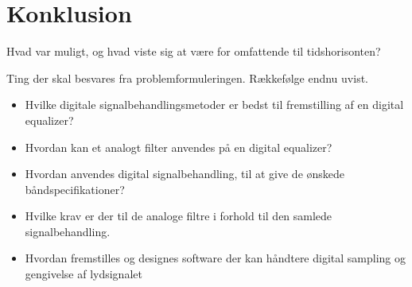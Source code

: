 \chapter{Konklusion} \label{kap:konklusion}

Hvad var muligt, og hvad viste sig at være for omfattende til tidshorisonten?

Ting der skal besvares fra problemformuleringen. Rækkefølge endnu uvist.
\begin{itemize}[noitemsep]
	\item Hvilke digitale signalbehandlingsmetoder er bedst til fremstilling af en digital equalizer?
	\item Hvordan kan et analogt filter anvendes på en digital equalizer?
	\item Hvordan anvendes digital signalbehandling, til at give de ønskede båndspecifikationer?
	\item Hvilke krav er der til de analoge filtre i forhold til den samlede signalbehandling.
	\item Hvordan fremstilles og designes software der kan håndtere digital sampling og gengivelse af lydsignalet
\end{itemize}